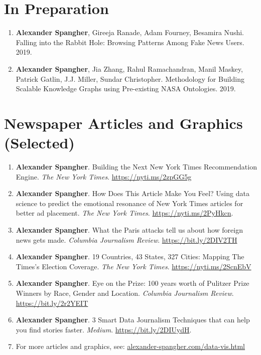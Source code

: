 \documentclass[margin]{res}
\begin{document}
\begin{resume}
\section{In Preparation}
\begin{enumerate}
	\item \textbf{Alexander Spangher}, Gireeja Ranade, Adam Fourney, Besamira Nushi. Falling into the Rabbit Hole: Browsing Patterns Among Fake News Users. 2019.
	\item \textbf{Alexander Spangher}, Jia Zhang, Rahul Ramachandran, Manil Maskey, Patrick Gatlin, J.J. Miller, Sundar Christopher. Methodology for Building Scalable Knowledge Graphs using Pre-existing NASA Ontologies. 2019.
\end{enumerate}

\section{Newspaper Articles and Graphics (Selected)}
\begin{enumerate}
	\item \textbf{Alexander Spangher}. Building the Next New York Times Recommendation Engine. \textit{The New York Times}. \url{https://nyti.ms/2zpGG5g}
	\item \textbf{Alexander Spangher}. How Does This Article Make You Feel? Using data science to predict the emotional resonance of New York Times articles for better ad placement. \textit{The New York Times}. \url{https://nyti.ms/2PyHkcn}.
	\item \textbf{Alexander Spangher}. What the Paris attacks tell us about how foreign news gets made. \textit{Columbia Journalism Review}. \url{https://bit.ly/2DIV2TH}
	\item \textbf{Alexander Spangher}. 19 Countries, 43 States, 327 Cities: Mapping The Times’s Election Coverage. \textit{The New York Times}. \url{https://nyti.ms/2ScnEbV}
	\item \textbf{Alexander Spangher}. Eye on the Prize: 100 years worth of Pulitzer Prize Winners by Race, Gender and Location. \textit{Columbia Journalism Review}. \url{https://bit.ly/2r2YEIT}
	\item \textbf{Alexander Spangher}. 3 Smart Data Journalism Techniques that can help you find stories faster. \textit{Medium}. \url{https://bit.ly/2DIUydH}.	
	\item For more articles and graphics, see: \url{alexander-spangher.com/data-vis.html}
\end{enumerate}



\end{resume}
\end{document}
